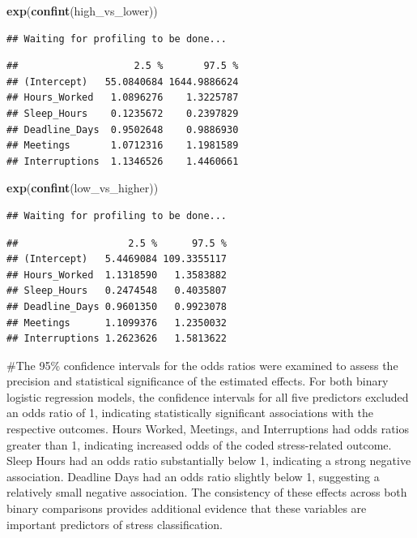 \documentclass[
]{article}
\newenvironment{Shaded}{\begin{snugshade}}{\end{snugshade}}
\newcommand{\FunctionTok}[1]{\textcolor[rgb]{0.13,0.29,0.53}{\textbf{#1}}}
\newcommand{\NormalTok}[1]{#1}
\begin{document}
\begin{Shaded}
\begin{Highlighting}[]
\FunctionTok{exp}\NormalTok{(}\FunctionTok{confint}\NormalTok{(high\_vs\_lower))}
\end{Highlighting}
\end{Shaded}

\begin{verbatim}
## Waiting for profiling to be done...
\end{verbatim}

\begin{verbatim}
##                    2.5 %       97.5 %
## (Intercept)   55.0840684 1644.9886624
## Hours_Worked   1.0896276    1.3225787
## Sleep_Hours    0.1235672    0.2397829
## Deadline_Days  0.9502648    0.9886930
## Meetings       1.0712316    1.1981589
## Interruptions  1.1346526    1.4460661
\end{verbatim}

\begin{Shaded}
\begin{Highlighting}[]
\FunctionTok{exp}\NormalTok{(}\FunctionTok{confint}\NormalTok{(low\_vs\_higher))}
\end{Highlighting}
\end{Shaded}

\begin{verbatim}
## Waiting for profiling to be done...
\end{verbatim}

\begin{verbatim}
##                   2.5 %      97.5 %
## (Intercept)   5.4469084 109.3355117
## Hours_Worked  1.1318590   1.3583882
## Sleep_Hours   0.2474548   0.4035807
## Deadline_Days 0.9601350   0.9923078
## Meetings      1.1099376   1.2350032
## Interruptions 1.2623626   1.5813622
\end{verbatim}

\#The 95\% confidence intervals for the odds ratios were examined to
assess the precision and statistical significance of the estimated
effects. For both binary logistic regression models, the confidence
intervals for all five predictors excluded an odds ratio of 1,
indicating statistically significant associations with the respective
outcomes. Hours Worked, Meetings, and Interruptions had odds ratios
greater than 1, indicating increased odds of the coded stress-related
outcome. Sleep Hours had an odds ratio substantially below 1, indicating
a strong negative association. Deadline Days had an odds ratio slightly
below 1, suggesting a relatively small negative association. The
consistency of these effects across both binary comparisons provides
additional evidence that these variables are important predictors of
stress classification.
\end{document}
